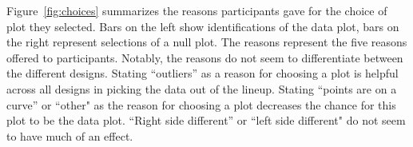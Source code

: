 \documentclass{article}\usepackage[]{graphicx}\usepackage[]{color}
\newcommand{\hh}[1]{{\color{magenta} #1}}
\newcommand{\hhnote}[1]{\todo[inline,color=magenta!40]{#1}}
\begin{document}
\hh{Figure~\ref{fig:choices} summarizes the reasons participants gave for the choice of plot they selected. Bars on the left show  identifications of the data plot, bars on the right represent selections of a null plot. The reasons represent the five reasons offered  to participants. Notably, the reasons do not seem to differentiate between the different designs. Stating ``outliers'' as a reason for choosing a plot is helpful across all designs in picking the data out of the lineup. Stating ``points are on a curve'' or ``other"  as the reason for choosing a plot decreases the chance for this plot to be the data plot. ``Right side different'' or ``left side different" do not seem to have much of an effect. } 


\end{document}
